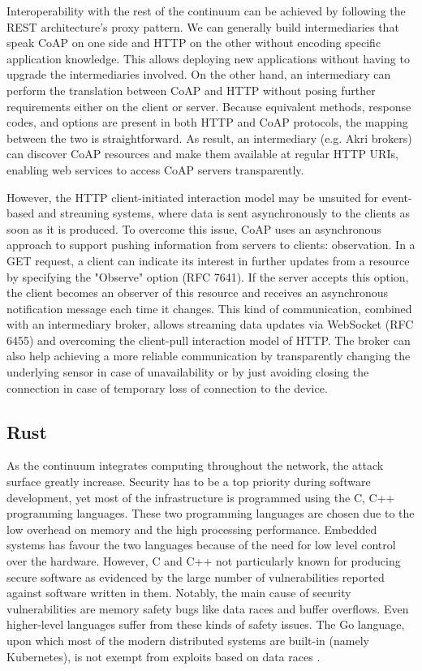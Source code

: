 \documentclass{ieeeaccess}
\begin{document}
Interoperability with the rest of the continuum can be achieved by following the REST architecture's proxy pattern. We can generally build intermediaries that speak CoAP on one side and HTTP on the other without encoding specific application knowledge. This allows deploying new applications without having to upgrade the intermediaries involved. On the other hand, an intermediary can perform the translation between CoAP and HTTP without posing further requirements either on the client or server. Because equivalent methods, response codes, and options are present in both HTTP and CoAP protocols, the mapping between the two is straightforward. As result, an intermediary (e.g. Akri brokers) can discover CoAP resources and make them available at regular HTTP URIs, enabling web services to access CoAP servers transparently.

However, the HTTP client-initiated interaction model may be unsuited for event-based and streaming systems, where data is sent asynchronously to the clients as soon as it is produced. To overcome this issue, CoAP uses an asynchronous approach to support pushing information from servers to clients: observation. In a GET request, a client can indicate its interest in further updates from a resource by specifying the "Observe" option (RFC 7641). If the server accepts this option, the client becomes an observer of this resource and receives an asynchronous notification message each time it changes. This kind of communication, combined with an intermediary broker, allows streaming data updates via WebSocket (RFC 6455) and overcoming the client-pull interaction model of HTTP. The broker can also help achieving a more reliable communication by transparently changing the underlying sensor in case of unavailability or by just avoiding closing the connection in case of temporary loss of connection to the device.

\subsection{Rust}
\label{sec:rust}

As the continuum integrates computing throughout the network, the attack surface greatly increase. Security has to be a top priority during software development, yet most of the infrastructure is programmed using the C, C++ programming languages. These two programming languages are chosen due to the low overhead on memory and the high processing performance. Embedded systems has favour the two languages because of the need for low level control over the hardware.  However, C and C++ not particularly known for producing secure software as evidenced by the large number of vulnerabilities reported against software written in them. Notably, the main cause of security vulnerabilities are memory safety bugs like data races and buffer overflows. Even higher-level languages suffer from these kinds of safety issues. The Go language, upon which most of the modern distributed systems are built-in (namely Kubernetes), is not exempt from exploits based on data races \cite{go-data-races}.
\end{document}
